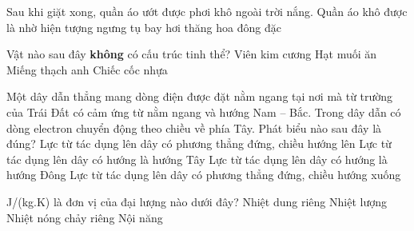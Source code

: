	\begin{ex}%
		Sau khi giặt xong, quần áo ướt được phơi khô ngoài trời nắng. Quần áo khô được là nhờ hiện tượng
		\choice
		{ngưng tụ}
		{\True bay hơi}
		{thăng hoa}
		{đông đặc}
	\end{ex}

	\begin{ex}%
		Vật nào sau đây \textbf{không} có cấu trúc tinh thể?
		\choice
		{Viên kim cương}
		{Hạt muối ăn}
		{Miếng thạch anh}
		{\True Chiếc cốc nhựa}
	\end{ex}

	\begin{ex}%
		Một dây dẫn thẳng mang dòng điện được đặt nằm ngang tại nơi mà từ trường của Trái Đất có cảm ứng từ nằm ngang và hướng Nam -- Bắc. Trong dây dẫn có dòng electron chuyển động theo chiều về phía Tây. Phát biểu nào sau đây là đúng?
		\choice
		{\True Lực từ tác dụng lên dây có phương thẳng đứng, chiều hướng lên}
		{Lực từ tác dụng lên dây có hướng là hướng Tây}
		{Lực từ tác dụng lên dây có hướng là hướng Đông}
		{Lực từ tác dụng lên dây có phương thẳng đứng, chiều hướng xuống}
	\end{ex}

	\begin{ex}%
		J/(kg.K) là đơn vị của đại lượng nào dưới đây?
		\choice
		{\True Nhiệt dung riêng}
		{Nhiệt lượng}
		{Nhiệt nóng chảy riêng}
		{Nội năng}
	\end{ex}


